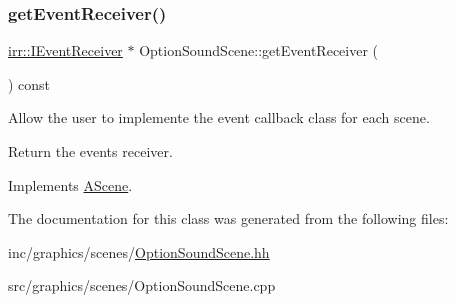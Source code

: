 \subsubsection{\texorpdfstring{get\+Event\+Receiver()}{getEventReceiver()}}
{\footnotesize\ttfamily \hyperlink{classirr_1_1IEventReceiver}{irr\+::\+I\+Event\+Receiver} $\ast$ Option\+Sound\+Scene\+::get\+Event\+Receiver (\begin{DoxyParamCaption}{ }\end{DoxyParamCaption}) const\hspace{0.3cm}{\ttfamily [virtual]}}



Allow the user to implemente the event callback class for each scene. 

Return the event\textquotesingle{}s receiver. 

Implements \hyperlink{classAScene_af521e5e6d30a5d2e5d30eb333e4d3abd}{A\+Scene}.



The documentation for this class was generated from the following files\+:\begin{DoxyCompactItemize}
\item 
inc/graphics/scenes/\hyperlink{OptionSoundScene_8hh}{Option\+Sound\+Scene.\+hh}\item 
src/graphics/scenes/Option\+Sound\+Scene.\+cpp\end{DoxyCompactItemize}
